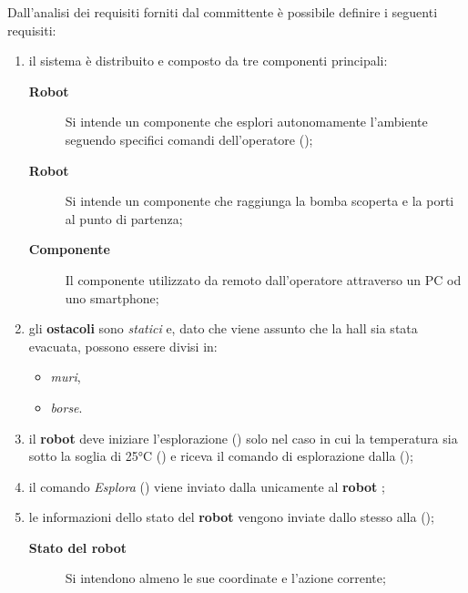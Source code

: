 
Dall'analisi dei requisiti forniti dal committente è possibile definire i seguenti requisiti:

\begin{enumerate}
  \item
    il sistema è distribuito e composto da tre componenti principali:
    \begin{description}
      \item[\textbf{Robot }] Si intende un componente che esplori autonomamente l'ambiente seguendo specifici comandi dell'operatore ();
      \item[\textbf{Robot }] Si intende un componente che raggiunga la bomba scoperta e la porti al punto di partenza;
      \item[\textbf{Componente }] Il componente utilizzato da remoto dall'operatore attraverso un PC od uno smartphone;
    \end{description}

  \item
    gli \textbf{ostacoli} sono \textit{statici} e, dato che viene assunto che la hall sia stata evacuata, possono essere divisi in:
    \begin{itemize}
      \item \textit{muri},
      \item \textit{borse}.
    \end{itemize}

  \item
    il \textbf{robot } deve iniziare l'esplorazione () solo nel caso in cui la temperatura sia sotto la soglia di 25°C () e riceva il comando di esplorazione dalla \textbf{} ();

  \item
    il comando \textit{Esplora} () viene inviato dalla \textbf{} unicamente al \textbf{robot };

  \item
    le informazioni dello stato del \textbf{robot } vengono inviate dallo stesso alla \textbf{} ();
    \begin{description}
      \item[\textbf{Stato del robot}] Si intendono almeno le sue coordinate e l'azione corrente;
    \end{description}


\end{enumerate}

